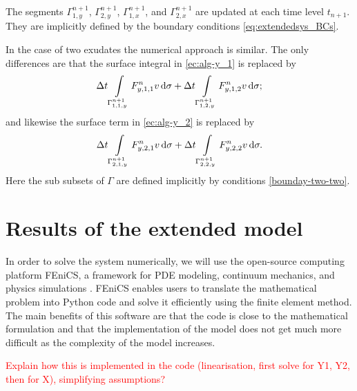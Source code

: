 \documentclass[11pt]{article}
\numberwithin{equation}{section}
\begin{document}
The segments \( \Gamma_{1,y}^{n+1}\), \(\Gamma_{2,y}^{n+1}\), \( \Gamma_{1,x}^{n+1}\), and \(\Gamma_{2,x}^{n+1}\) are updated at each time level \(t_{n+1}\). They are implicitly defined by the boundary conditions \eqref{eq:extendedsys_BCs}.


\vspace{1\baselineskip}
In the case of two exudates the numerical approach is similar. The only differences are that the surface integral in \eqref{ec:alg-y_1} is replaced by
\[
    \Delta t \int\limits_{\Gamma_{1,1,y}^{n+1}} F_{y,1,1}^n v \dif\sigma
    + \Delta t \int\limits_{\Gamma_{1,2,y}^{n+1}} F_{y,1,2}^n v \dif\sigma;
\]
and likewise the surface term in \eqref{ec:alg-y_2} is replaced by
\[
    \Delta t \int\limits_{\Gamma_{2,1,y}^{n+1}} F_{y,2,1}^n v \dif\sigma
    +\Delta t \int\limits_{\Gamma_{2,2,y}^{n+1}} F_{y,2,2}^n v \dif\sigma.
\]
Here the sub subsets of \(\Gamma\) are defined implicitly by conditions \eqref{bounday-two-two}.











\section{Results of the extended model}
\label{sec:Results_Extension}


In order to solve the system numerically, we will use the open-source computing platform FEniCS, a framework for PDE modeling, continuum mechanics, and physics simulations \cite{fenics}. FEniCS enables users to translate the mathematical problem into Python code and solve it efficiently using the finite element method. The main benefits of this software are that the code is close to the mathematical formulation and that the implementation of the model does not get much more difficult as the complexity of the model increases.

\textcolor{red}{Explain how this is implemented in the code (linearisation, first solve for Y1, Y2, then for X), simplifying assumptions?}
\end{document}
